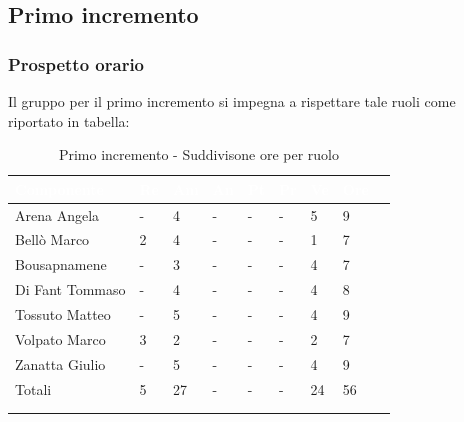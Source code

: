 \subsection{Primo incremento} 
{
    \subsubsection{Prospetto orario}
    {
    Il gruppo per il primo incremento si impegna a rispettare tale ruoli come riportato in tabella:
      \setlength{\freewidth}{\dimexpr\textwidth-30\tabcolsep}
      \renewcommand{\arraystretch}{1.0}
      \setlength{\aboverulesep}{0pt}
      \setlength{\belowrulesep}{0pt}
      \begin{longtable}{C{.4\freewidth} C{.1\freewidth} C{.1\freewidth} C{.1\freewidth} C{.1\freewidth} C{.1\freewidth} C{.1\freewidth} C{.1\freewidth} C{.1\freewidth}}
      \toprule
      \textcolor{white}{\textbf{Componente}}&
      \textcolor{white}{\textbf{Re}}&
      \textcolor{white}{\textbf{Am}}&
      \textcolor{white}{\textbf{An}}&
      \textcolor{white}{\textbf{Pt}}&
      \textcolor{white}{\textbf{Pr}}&
      \textcolor{white}{\textbf{Ve}}&
      \textcolor{white}{\textbf{Ore}}\\
      \toprule
      \endhead

      Arena Angela & - & 4 & - & - & - & 5 & 9 \\
      Bellò Marco & 2 & 4 & - & - & - & 1 & 7 \\
      Bousapnamene & - & 3 & - & - & - & 4 & 7 \\
      Di Fant Tommaso & - & 4 & - & - & - & 4 & 8 \\
      Tossuto Matteo & - & 5 & - & - & - & 4 & 9 \\
      Volpato Marco & 3 & 2 & - & - & - & 2 & 7 \\
      Zanatta Giulio & - & 5 & - & - & - & 4 & 9 \\
      Totali & 5 & 27 & - & - & - & 24 & 56 \\
      \bottomrule
      \\
      \caption{Primo incremento - Suddivisone ore per ruolo}
      \end{longtable} 

}}
